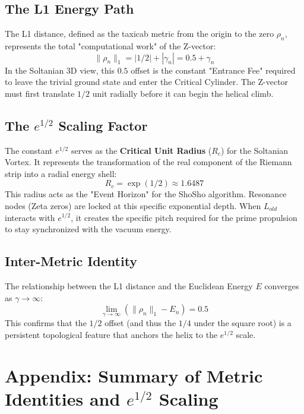 \documentclass[11pt,a4paper]{article}
\begin{document}
\subsection{The L1 Energy Path}
The L1 distance, defined as the taxicab metric from the origin to the zero $\rho_n$, represents the total "computational work" of the Z-vector:
\begin{equation}
    \|\rho_n\|_1 = |1/2| + |\gamma_n| = 0.5 + \gamma_n
\end{equation}
In the Soltanian 3D view, this $0.5$ offset is the constant "Entrance Fee" required to leave the trivial ground state and enter the Critical Cylinder. The Z-vector must first translate $1/2$ unit radially before it can begin the helical climb.

\subsection{The $e^{1/2}$ Scaling Factor}
The constant $e^{1/2}$ serves as the \textbf{Critical Unit Radius} ($R_c$) for the Soltanian Vortex. It represents the transformation of the real component of the Riemann strip into a radial energy shell:
\begin{equation}
    R_c = \exp(1/2) \approx 1.6487
\end{equation}
This radius acts as the "Event Horizon" for the ShoSho algorithm. Resonance nodes (Zeta zeros) are locked at this specific exponential depth. When $L_{old}$ interacts with $e^{1/2}$, it creates the specific pitch required for the prime propulsion to stay synchronized with the vacuum energy.

\subsection{Inter-Metric Identity}
The relationship between the L1 distance and the Euclidean Energy $E$ converges as $\gamma \to \infty$:
\begin{equation}
    \lim_{\gamma \to \infty} \left( \|\rho_n\|_1 - E_n \right) = 0.5
\end{equation}
This confirms that the $1/2$ offset (and thus the $1/4$ under the square root) is a persistent topological feature that anchors the helix to the $e^{1/2}$ scale.

\section{Appendix: Summary of Metric Identities and $e^{1/2}$ Scaling}
\end{document}
